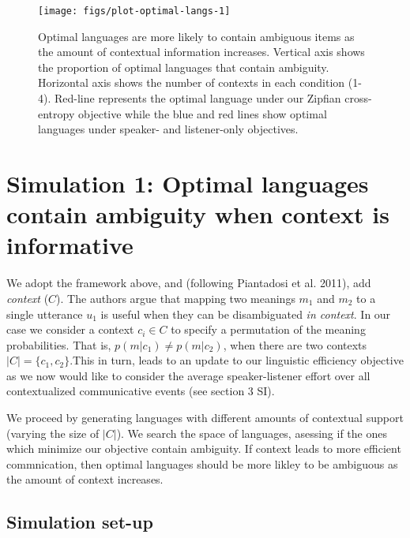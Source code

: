 \documentclass[10pt, letterpaper]{article}
\newenvironment{CodeChunk}{}{}
\begin{document}
\begin{CodeChunk}
\begin{figure*}[h]

{\centering \texttt{[image: figs/plot-optimal-langs-1]} 

}

\caption[Optimal languages are more likely to contain ambiguous items as the amount of contextual information increases]{Optimal languages are more likely to contain ambiguous items as the amount of contextual information increases. Vertical axis shows the proportion of optimal languages that contain ambiguity. Horizontal axis shows the number of contexts in each condition (1-4). Red-line represents the optimal language under our Zipfian cross-entropy objective while the blue and red lines show optimal languages under speaker- and listener-only objectives.}\label{fig:plot-optimal-langs}
\end{figure*}
\end{CodeChunk}

\section{Simulation 1: Optimal languages contain ambiguity when context
is
informative}\label{simulation-1-optimal-languages-contain-ambiguity-when-context-is-informative}

We adopt the framework above, and (following Piantadosi et al. 2011),
add \textit{context} (\(C\)). The authors argue that mapping two
meanings \(m_1\) and \(m_2\) to a single utterance \(u_1\) is useful
when they can be disambiguated \emph{in context}. In our case we
consider a context \(c_i \in C\) to specify a permutation of the meaning
probabilities. That is, \(p(m|c_1) \neq p(m|c_2)\), when there are two
contexts \(|C| = \{c_1, c_2\}\).This in turn, leads to an update to our
linguistic efficiency objective as we now would like to consider the
average speaker-listener effort over all contextualized communicative
events (see section 3 SI).\par

We proceed by generating languages with different amounts of contextual
support (varying the size of \(|C|\)). We search the space of languages,
asessing if the ones which minimize our objective contain ambiguity. If
context leads to more efficient commnication, then optimal languages
should be more likley to be ambiguous as the amount of context
increases.\par

\subsection{Simulation set-up}\label{simulation-set-up}
\end{document}
